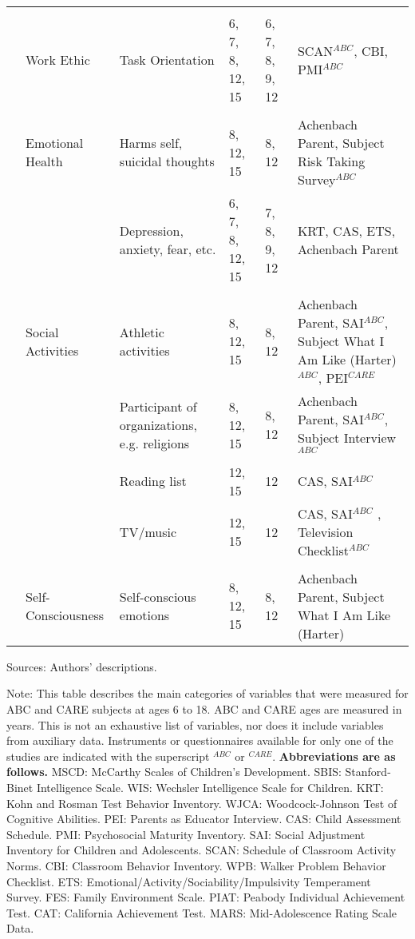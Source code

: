 \begin{sidewaystable}[H]
\begin{threeparttable}
\begin{tabular}{L{3.5cm} C{3.5cm} C{5cm} C{1.5cm} C{1.5cm} C{6cm}}
	&	\\
	&	Work Ethic	&	Task Orientation	&	6, 7, 8, 12, 15	&	6, 7, 8, 9, 12 	&	SCAN$^{ABC}$, CBI, PMI$^{ABC}$		\\
	&	\\
	&	Emotional Health	&	Harms self, suicidal thoughts	&	8, 12, 15	&	8, 12	 	&	Achenbach Parent,  Subject Risk Taking Survey$^{ABC}$		\\
	&		&	Depression, anxiety, fear, etc.	&	6, 7, 8, 12, 15	&	7, 8, 9, 12	&	KRT, CAS, ETS,  Achenbach Parent	\\
	&	\\
	&	Social Activities	&	Athletic activities	&	8, 12, 15	&	8, 12		&	Achenbach Parent, SAI$^{ABC}$, Subject What I Am Like (Harter)$^{ABC}$, PEI$^{CARE}$	\\
	&		&	Participant of organizations, e.g. religions	&	8, 12, 15	&	8, 12	&	Achenbach Parent, SAI$^{ABC}$, Subject Interview$^{ABC}$	\\
	&		&	Reading list	&	12, 15	&	12	&	CAS, SAI$^{ABC}$	 \\
	&		&	TV/music	&	12, 15	&	12	&	CAS, SAI$^{ABC}$	, Television Checklist$^{ABC}$		\\
	&	\\
	&	Self-Consciousness	&	Self-conscious emotions	&	8, 12, 15	&	8, 12	&	Achenbach Parent, Subject What I Am Like (Harter)	\\ \bottomrule
	\end{tabular}
\begin{tablenotes}
\scriptsize
\item Sources: Authors' descriptions. \\
\item Note: This table describes the main categories of variables that were measured for ABC and CARE subjects at ages 6 to 18. ABC and CARE ages are measured in years. This is not an exhaustive list of variables, nor does it include variables from auxiliary data.  Instruments or questionnaires available for only one of the studies are indicated with the superscript $^{ABC}$ or $^{CARE}$. \textbf{Abbreviations are as follows.}  MSCD: McCarthy Scales of Children's Development. SBIS: Stanford-Binet Intelligence Scale. WIS: Wechsler Intelligence Scale for Children. KRT: Kohn and Rosman Test Behavior Inventory. WJCA: Woodcock-Johnson Test of Cognitive Abilities. PEI: Parents as Educator Interview. CAS: Child Assessment Schedule. PMI: Psychosocial Maturity Inventory. SAI: Social Adjustment Inventory for Children and Adolescents. SCAN: Schedule of Classroom Activity Norms. CBI: Classroom Behavior Inventory. WPB: Walker Problem Behavior Checklist. ETS: Emotional/Activity/Sociability/Impulsivity Temperament Survey. FES: Family Environment Scale. PIAT: Peabody Individual Achievement Test. CAT: California Achievement Test. MARS: Mid-Adolescence Rating Scale Data.
\end{tablenotes}
\end{threeparttable}
\end{sidewaystable}

